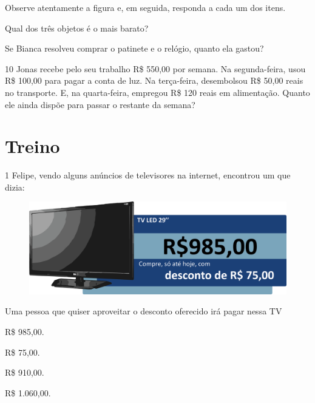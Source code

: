 Observe atentamente a figura e, em seguida, responda a cada um dos itens.

\begin{escolha}
\item Qual dos três objetos é o mais barato?\\

\item Se Bianca resolveu comprar o patinete e o relógio, quanto ela gastou?\\
\end{escolha}

\num{10} Jonas recebe pelo seu trabalho R\$ 550,00 por semana. Na segunda-feira, usou R\$ 100,00 para pagar a conta de luz. Na terça-feira, desembolsou R\$ 50,00 reais no transporte. E, na quarta-feira, empregou R\$ 120 reais em alimentação. Quanto ele ainda dispõe para passar o restante da semana?


\section*{Treino}

\num{1} Felipe, vendo alguns anúncios de televisores na internet, encontrou um que dizia:

\begin{figure}[htpb!]
\centering
\includegraphics[width=\textwidth]{./media/image73.png}
\end{figure}

Uma pessoa que quiser aproveitar o desconto oferecido irá pagar nessa TV

\begin{escolha}
\item
  R\$ 985,00.
\item
  R\$ 75,00.
\item
  R\$ 910,00.
\item
  R\$ 1.060,00.
\end{escolha}

